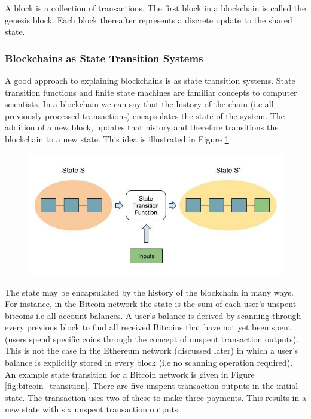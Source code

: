 A block is a collection of transactions. The first block in a blockchain is called the genesis block. Each block thereafter represents a discrete update to the shared state. \\

\subsubsection{Blockchains as State Transition Systems}
A good approach to explaining blockchains is as state transition systems. State transition functions and finite state machines are familiar concepts to computer scientists. In a blockchain we can say that the history of the chain (i.e all previously processed transactions) encapsulates the state of the system. The addition of a new block, updates that history and therefore transitions the blockchain to a new state. This idea is illustrated in Figure \ref{fig:blockchain_transition} \\

\begin{figure}
\centering
\includegraphics[width=\textwidth]{Figures/blockchain_transition}
\decoRule
\caption[]{}
\label{fig:blockchain_transition}
\end{figure}

The state may be encapsulated by the history of the blockchain in many ways. For instance, in the Bitcoin network the state is the sum of each user's unspent bitcoins i.e all account balances. A user's balance is derived by scanning through every previous block to find all received Bitcoins that have not yet been spent (users spend specific coins through the concept of unspent transaction outputs). This is not the case in the Ethereum network (discussed later) in which a user's balance is explicitly stored in every block (i.e no scanning operation required). An example state transition for a Bitcoin network is given in Figure \ref{fig:bitcoin_transition}. There are five unspent transaction outputs in the initial state. The transaction uses two of these to make three payments. This results in a new state with six unspent transaction outputs. \\

